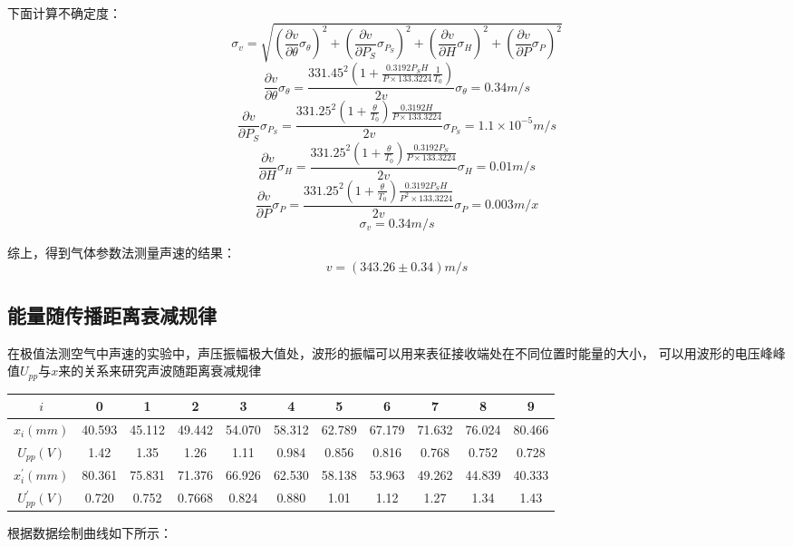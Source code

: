 \documentclass{article}
\begin{document}
    下面计算不确定度：
    $$\sigma_v=\sqrt{(\frac{\partial v}{\partial\theta}\sigma_\theta)^2 + (\frac{\partial v}{\partial P_S}\sigma_{P_S})^2+(\frac{\partial v}{\partial H}\sigma_H)^2+(\frac{\partial v}{\partial P}\sigma_P)^2}$$
    $$\frac{\partial v}{\partial\theta}\sigma_\theta=\frac{331.45^2(1+\frac{0.3192P_S H}{P\times133.3224}\frac{1}{T_0})}{2v}\sigma_\theta=0.34m/s$$
    $$\frac{\partial v}{\partial P_S}\sigma_{P_S}=\frac{331.25^2(1+\frac{\theta}{T_0})\frac{0.3192H}{P\times133.3224}}{2v}\sigma_{P_S}=1.1\times 10^{-5}m/s$$
    $$\frac{\partial v}{\partial H}\sigma_H=\frac{331.25^2(1+\frac{\theta}{T_0})\frac{0.3192P_S}{P\times133.3224}}{2v}\sigma_{H}=0.01m/s$$
    $$\frac{\partial v}{\partial P}\sigma_P=\frac{331.25^2(1+\frac{\theta}{T_0})\frac{0.3192P_S H}{P^2\times133.3224}}{2v}\sigma_{P}=0.003m/x$$
    $$\sigma_v=0.34m/s$$
    
    综上，得到气体参数法测量声速的结果：
    $$v=(343.26\pm0.34)m/s$$

    \subsection{能量随传播距离衰减规律}
    在极值法测空气中声速的实验中，声压振幅极大值处，波形的振幅可以用来表征接收端处在不同位置时能量的大小，
    可以用波形的电压峰峰值$U_{pp}$与$x$来的关系来研究声波随距离衰减规律

    \begin{center}
        \begin{tabular}{|c|c|c|c|c|c|c|c|c|c|c|}
            \hline
            $i$ & 0 & 1 & 2 & 3 & 4 & 5 & 6 & 7 & 8 & 9 \\
            \hline
            $x_i(mm)$ & 40.593 & 45.112 & 49.442 & 54.070 & 58.312 & 62.789 & 67.179 & 71.632 & 76.024 & 80.466 \\
            \hline 
            $U_{pp}(V)$  & 1.42 & 1.35 & 1.26 & 1.11 & 0.984 & 0.856 & 0.816 & 0.768 & 0.752 & 0.728 \\
            \hline
            $x_i^{'}(mm)$ & 80.361 & 75.831 & 71.376 & 66.926 & 62.530 & 58.138 & 53.963 & 49.262 & 44.839 & 40.333 \\
            \hline
            $U_{pp}^{'}(V)$ & 0.720 & 0.752 & 0.7668 & 0.824 & 0.880 & 1.01 & 1.12 & 1.27 & 1.34 & 1.43 \\
            \hline
        \end{tabular}
    \end{center}

    根据数据绘制曲线如下所示：
\end{document}
